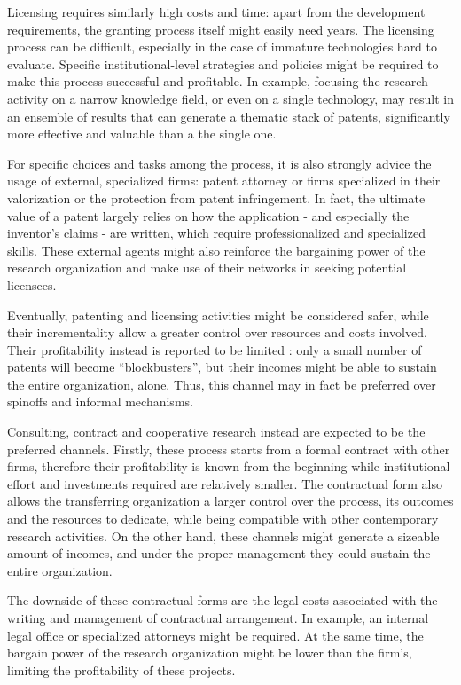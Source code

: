 Licensing requires similarly high costs and time: apart from the development requirements, the granting process itself might easily need years. The licensing process can be difficult, especially in the case of immature technologies hard to evaluate. Specific institutional-level strategies and policies might be required to make this process successful and profitable. In example, focusing the research activity on a narrow knowledge field, or even on a single technology, may result in an ensemble of results that can generate a thematic stack of patents, significantly more effective and valuable than a the single one.

For specific choices and tasks among the process, it is also strongly advice the usage of external, specialized firms: patent attorney or firms specialized in their valorization or the protection from patent infringement. In fact, the ultimate value of a patent largely relies on how the application - and especially the inventor's claims - are written, which require professionalized and specialized skills. These external agents might also reinforce the bargaining power of the research organization and make use of their networks in seeking potential licensees. 

Eventually, patenting and licensing activities might be considered safer, while their incrementality allow a greater control over resources and costs involved. Their profitability instead is reported to be limited \citep{Balderi2010}: only a small number of patents will become \enquote{blockbusters}, but their incomes might be able to sustain the entire organization, alone. Thus, this channel may in fact be preferred over spinoffs and informal mechanisms.

Consulting, contract and cooperative research instead are expected to be the preferred channels. Firstly, these process starts from a formal contract with other firms, therefore their profitability is known from the beginning while institutional effort and investments required are relatively smaller. The contractual form also allows the transferring organization a larger control over the process, its outcomes and the resources to dedicate, while being compatible with other contemporary research activities. On the other hand, these channels might generate a sizeable amount of incomes, and under the proper management they could sustain the entire organization. 

The downside of these contractual forms are the legal costs associated with the writing and management of contractual arrangement. In example, an internal legal office or specialized attorneys might be required. At the same time, the bargain power of the research organization might be lower than the firm's, limiting the profitability of these projects. 

